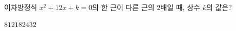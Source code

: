 이차방정식 $x^2+12x+k=0$의 한 근이 다른 근의 $2$배일 때, 상수 $k$의 값은?
\begin{choices32}{$8$}{$12$}{$18$}{$24$}{$32$}\end{choices32}
